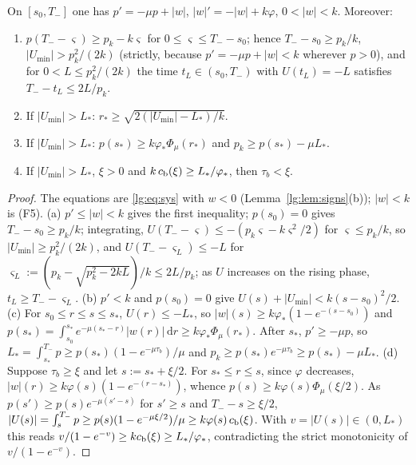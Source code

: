 \begin{lemma}\label{lg:lem:rise}
On $[s_0,T_-]$ one has $p'=-\mu p+|w|$, $|w|'=-|w|+k\varphi$, $0<|w|<k$. Moreover:
\begin{enumerate}[label=\textup{(\alph*)}]
\item $p(T_--\varsigma)\ge p_k-k\varsigma$ for $0\le\varsigma\le T_--s_0$; hence $T_--s_0\ge p_k/k$,
$|U_{\min}|>p_k^2/(2k)$ (strictly, because $p'=-\mu p+|w|<k$ wherever $p>0$), and for $0<L\le p_k^2/(2k)$ the time $t_L\in(s_0,T_-)$ with $U(t_L)=-L$ satisfies
$T_--t_L\le 2L/p_k$.
\item If $|U_{\min}|>L_\ast$: $r_\ast\ge\sqrt{2(|U_{\min}|-L_\ast)/k}$.
\item If $|U_{\min}|>L_\ast$: $p(s_\ast)\ge k\varphi_\ast\Phi_\mu(r_\ast)$ and $p_k\ge p(s_\ast)-\mu L_\ast$.
\item If $|U_{\min}|>L_\ast$, $\xi>0$ and $k\,c_{\rm b}(\xi)\ge L_\ast/\varphi_\ast$, then $\tau_b<\xi$.
\end{enumerate}
\end{lemma}
\begin{proof}
The equations are \eqref{lg:eq:sys} with $w<0$ (Lemma~\ref{lg:lem:signs}(b)); $|w|<k$ is (F5).
(a) $p'\le|w|<k$ gives the first inequality; $p(s_0)=0$ gives $T_--s_0\ge p_k/k$; integrating,
$U(T_--\varsigma)\le-(p_k\varsigma-k\varsigma^2/2)$ for $\varsigma\le p_k/k$, so $|U_{\min}|\ge p_k^2/(2k)$, and
$U(T_--\varsigma_L)\le-L$ for $\varsigma_L:=(p_k-\sqrt{p_k^2-2kL})/k\le 2L/p_k$; as $U$ increases on the
rising phase, $t_L\ge T_--\varsigma_L$.
(b) $p'<k$ and $p(s_0)=0$ give $U(s)+|U_{\min}|<k(s-s_0)^2/2$.
(c) For $s_0\le r\le s\le s_\ast$, $U(r)\le-L_\ast$, so $|w|(s)\ge k\varphi_\ast(1-e^{-(s-s_0)})$ and
$p(s_\ast)=\int_{s_0}^{s_\ast}e^{-\mu(s_\ast-r)}|w(r)|\,\mathrm dr\ge k\varphi_\ast\Phi_\mu(r_\ast)$. After
$s_\ast$, $p'\ge-\mu p$, so $L_\ast=\int_{s_\ast}^{T_-}p\ge p(s_\ast)(1-e^{-\mu\tau_b})/\mu$ and
$p_k\ge p(s_\ast)e^{-\mu\tau_b}\ge p(s_\ast)-\mu L_\ast$.
(d) Suppose $\tau_b\ge \xi$ and let $s:=s_\ast+\xi/2$. For $s_\ast\le r\le s$, since $\varphi$ decreases,
$|w|(r)\ge k\varphi(s)(1-e^{-(r-s_\ast)})$, whence $p(s)\ge k\varphi(s)\Phi_\mu(\xi/2)$. As
$p(s')\ge p(s)e^{-\mu(s'-s)}$ for $s'\ge s$ and $T_--s\ge \xi/2$,
$|U(s)|=\int_s^{T_-}p\ge p(s)(1-e^{-\mu \xi/2})/\mu\ge k\varphi(s)\,c_{\rm b}(\xi)$. With
$v=|U(s)|\in(0,L_\ast)$ this reads $v/(1-e^{-v})\ge kc_{\rm b}(\xi)\ge L_\ast/\varphi_\ast$, contradicting the
strict monotonicity of $v/(1-e^{-v})$.
\end{proof}

